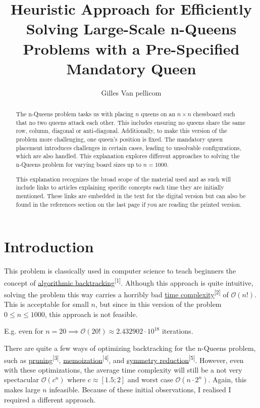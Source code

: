 \documentclass{article}
\title{Heuristic Approach for Efficiently Solving Large-Scale n-Queens Problems with a Pre-Specified Mandatory Queen}
\author{Gilles Van pellicom}
\begin{document}
\maketitle

\begin{abstract}
    \setlength{\parindent}{0pt}
    \setlength{\parskip}{1em}
    The n-Queens problem tasks us with placing \(n\) queens on an \(n \times n\) chessboard such that no two queens attack each other.
    This includes ensuring no queens share the same row, column, diagonal or anti-diagonal. Additionally, to make this version of the problem more challenging,
    one queen's position is fixed.
    The mandatory queen placement introduces challenges in certain cases, leading to unsolvable configurations, which are also handled.
    This explanation explores different approaches to solving the n-Queens problem for varying board sizes up to \(n = 1000\).

    This explanation recognizes the broad scope of the material used and as such will include links to articles explaining specific concepts
    each time they are initially mentioned.
    These links are embedded in the text for the digital version but can also be found in the references section on the last page if you are reading the printed version.
\end{abstract}

\clearpage

{
    \hypersetup{linkcolor=black}
    \tableofcontents
}

\clearpage

\section{Introduction}
This problem is classically used in computer science to teach beginners the concept of
\href{https://en.wikipedia.org/wiki/Backtracking}{algorithmic backtracking}\textsuperscript{[1]}.
Although this approach is quite intuitive, solving the problem this way carries a horribly bad
\href{https://en.wikipedia.org/wiki/Time_complexity}{time complexity}\textsuperscript{[2]} of \(\mathcal{O}(n!)\).
This is acceptable for small \(n\), but since in this version of the problem \(0 \leq n \leq 1000\), this approach is not feasible.

E.g. even for \(n = 20 \implies \mathcal{O}(20!) \approx 2.432902 \cdot 10^{18}\) iterations.

There are quite a few ways of optimizing backtracking for the n-Queens problem, such as
\href{https://en.wikipedia.org/wiki/Decision_tree_pruning}{pruning}\textsuperscript{[3]},
\href{https://en.wikipedia.org/wiki/Memoization}{memoization}\textsuperscript{[4]}, and
\href{https://www.khoury.northeastern.edu/home/wahl/Publications/ew05b.pdf}{symmetry reduction}\textsuperscript{[5]}.
However, even with these optimizations, the average time complexity will still be a not very spectacular
\(\mathcal{O}(c^n)\) where \(c \approx [1.5; 2]\) and worst case \(\mathcal{O}(n \cdot 2^n)\). Again, this makes large \(n\) infeasible.
Because of these initial observations, I realised I required a different approach.
\end{document}
